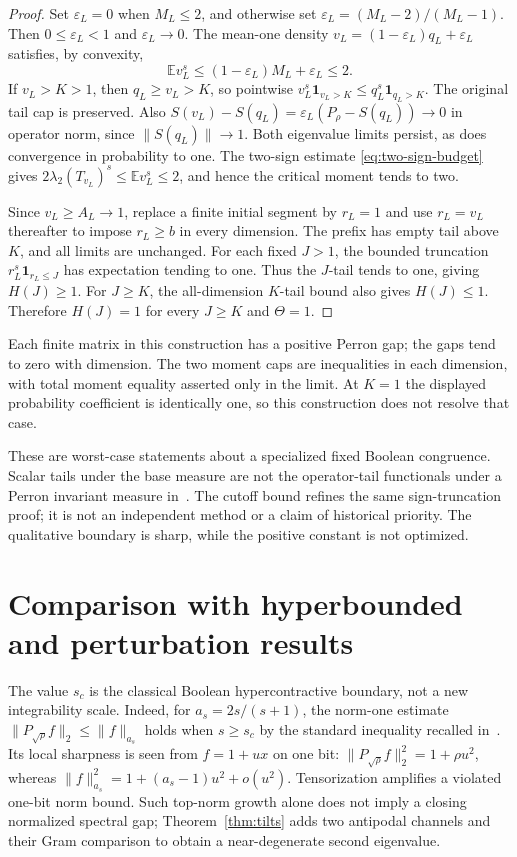 \documentclass[11pt]{article}
\begin{document}
\begin{proof}
Set $\varepsilon_L=0$ when $M_L\le2$, and otherwise set
$\varepsilon_L=(M_L-2)/(M_L-1)$. Then $0\le\varepsilon_L<1$ and
$\varepsilon_L\to0$. The mean-one density
$v_L=(1-\varepsilon_L)q_L+\varepsilon_L$ satisfies, by convexity,
\[
 \mathbb E v_L^s\le(1-\varepsilon_L)M_L+\varepsilon_L\le2.
\]
If $v_L>K>1$, then $q_L\ge v_L>K$, so pointwise
$v_L^s\mathbf1_{v_L>K}\le q_L^s\mathbf1_{q_L>K}$. The original
tail cap is preserved. Also
$S(v_L)-S(q_L)=\varepsilon_L(P_\rho-S(q_L))\to0$ in operator norm,
since $\|S(q_L)\|\to1$. Both eigenvalue limits persist, as does
convergence in probability to one. The two-sign estimate
\eqref{eq:two-sign-budget} gives
$2\lambda_2(T_{v_L})^s\le\mathbb E v_L^s\le2$, and hence the
critical moment tends to two.

Since $v_L\ge A_L\to1$, replace a finite initial segment by $r_L=1$
and use $r_L=v_L$ thereafter to impose $r_L\ge b$ in every dimension.
The prefix has empty tail above $K$, and all limits are unchanged.
For each fixed $J>1$, the bounded truncation
$r_L^s\mathbf1_{r_L\le J}$ has expectation tending to one. Thus the
$J$-tail tends to one, giving $H(J)\ge1$. For $J\ge K$, the
all-dimension $K$-tail bound also gives $H(J)\le1$. Therefore
$H(J)=1$ for every $J\ge K$ and $\Theta=1$.
\end{proof}

Each finite matrix in this construction has a positive Perron gap;
the gaps tend to zero with dimension. The two moment caps are
inequalities in each dimension, with total moment equality asserted
only in the limit. At $K=1$ the displayed probability coefficient is
identically one, so this construction does not resolve that case.


These are worst-case statements about a specialized fixed Boolean
congruence. Scalar tails under the base measure are not the operator-tail
functionals under a Perron invariant measure in~\cite{Wang}. The cutoff
bound refines the same sign-truncation proof; it is not an independent
method or a claim of historical priority. The qualitative boundary is
sharp, while the positive constant is not optimized.

\section{Comparison with hyperbounded and perturbation results}
The value $s_c$ is the classical Boolean hypercontractive boundary,
not a new integrability scale. Indeed, for $a_s=2s/(s+1)$, the
norm-one estimate $\|P_{\sqrt\rho}f\|_2\le\|f\|_{a_s}$ holds
when $s\ge s_c$ by the standard inequality recalled in~\cite{MOS}.
Its local sharpness is seen from $f=1+ux$ on one bit:
$\|P_{\sqrt\rho}f\|_2^2=1+\rho u^2$, whereas
$\|f\|_{a_s}^2=1+(a_s-1)u^2+o(u^2)$.
Tensorization amplifies a violated one-bit norm bound. Such top-norm
growth alone does not imply a closing normalized spectral gap;
Theorem~\ref{thm:tilts} adds two antipodal channels and their Gram
comparison to obtain a near-degenerate second eigenvalue.
\end{document}
